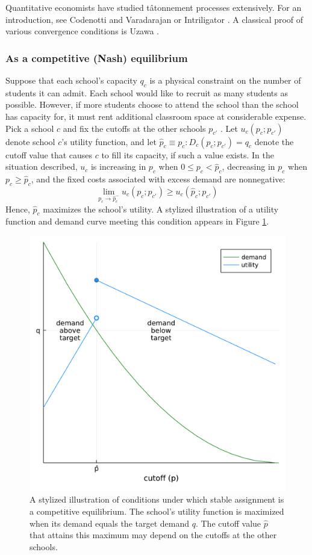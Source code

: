 \documentclass[12pt]{article}
\numberwithin{equation}{subsection}
\theoremstyle{definition}
\begin{document}
Quantitative economists have studied t\^{a}tonnement processes extensively. For an introduction, see Codenotti and Varadarajan \parencite*{compmkteq} or Intriligator \parencite*[][chap. 9]{mathematicaloptandecontheory}. A classical proof of various convergence conditions is Uzawa \parencite*{walrastatonnement}. 

\subsubsection{As a competitive (Nash) equilibrium} \label{asacompeq}
Suppose that each school's capacity $q_c$ is a physical constraint on the number of students it can admit. Each school would like to recruit as many students as possible. However, if more students choose to attend the school than the school has capacity for, it must rent additional classroom space at considerable expense. Pick a school $c$ and fix the cutoffs at the other schools $p_{c'}$ . Let $u_c(p_c; p_{c'})$ denote school $c$'s utility function, and let $\hat p_c \equiv p_c: D_c(p_c; p_{c'}) = q_c$ denote the cutoff value that causes $c$ to fill its capacity, if such a value exists. In the situation described, $u_c$ is increasing in $p_c$ when $0 \leq p_c < \hat p_c$, decreasing in $p_c$ when $p_c \geq \hat p_c$, and the fixed costs associated with excess demand are nonnegative: \[\lim_{p_c \to \hat p_c^-} u_c(p_c; p_{c'}) \geq u_c(\hat p_c; p_{c'})\]
Hence, $\hat p_c$ maximizes the school's utility. A stylized illustration of a utility function and demand curve meeting this condition appears in Figure \ref{stylized-utility}. 

\begin{figure}
\begin{center}\includegraphics[width=0.7\linewidth, ]{plots/stylized-utility.pdf}\end{center}
\captionsetup{singlelinecheck=off}
    \caption[.]{A stylized illustration of conditions under which stable assignment is a competitive equilibrium. The school's utility function is maximized when its demand equals the target demand $q$. The cutoff value $\hat p$ that attains this maximum may depend on the cutoffs at the other schools.}
\label{stylized-utility}
\end{figure}
\end{document}
